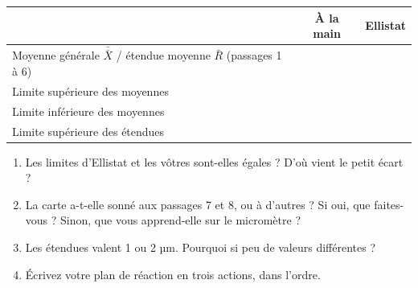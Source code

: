 \documentclass[10pt,a4paper]{article}
\begin{document}
\par\vspace{4pt}
{\renewcommand{\arraystretch}{1.35}\begin{tabularx}{\linewidth}{|X|c|c|}\hline & \textbf{À la main} & \textbf{Ellistat}\\\hline
Moyenne générale $\bar{\bar X}$ \quad / \quad étendue moyenne $\bar R$ (passages 1 à 6) & \hspace{28mm} & \hspace{28mm}\\\hline
Limite supérieure des moyennes & \hspace{28mm} & \hspace{28mm}\\\hline
Limite inférieure des moyennes & \hspace{28mm} & \hspace{28mm}\\\hline
Limite supérieure des étendues & \hspace{28mm} & \hspace{28mm}\\\hline
\end{tabularx}}\par
\newpage
{}
\begin{enumerate}[label=\textcolor{cyan}{\textbf{Q\arabic*.}},leftmargin=22pt]
\item Les limites d'Ellistat et les vôtres sont-elles égales ? D'où vient le petit écart ?\reponse[1]
\item La carte a-t-elle sonné aux passages 7 et 8, ou à d'autres ? Si oui, que faites-vous ? Sinon, que vous apprend-elle sur le micromètre ?\reponse[2]
\item Les étendues valent 1 ou 2 µm. Pourquoi si peu de valeurs différentes ?\reponse[1]
\item Écrivez votre plan de réaction en trois actions, dans l'ordre.\reponse[3]
\end{enumerate}
\end{document}
